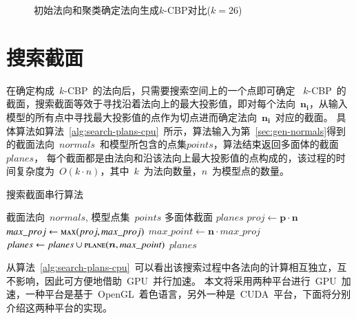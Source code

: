 \begin{figure}[htbp]
\setcounter{subfigure}{0}
  \centering
  \hspace{3em}%
  \hspace{3em}%
  \caption{初始法向和聚类确定法向生成$k$-CBP对比($k=26$)}
  \label{lbl:kemans-fixed-kcbp}
\end{figure}

\section{搜索截面}
\label{sec:search:planes}

在确定构成~$k$-CBP~的法向后，只需要搜索空间上的一个点即可确定
~$k$-CBP~的截面，搜索截面等效于寻找沿着法向上的最大投影值，即对每个法向~$\bm{n_i}$，从输入模型的所有点中寻找最大投影值的点作为切点进而确定法向~$\bm{n_i}$~对应的截面。
具体算法如算法~\ref{alg:search-plans-cpu}~所示，算法输入为第~\ref{sec:gen-normals}得到的截面法向~$normals$~和模型所包含的点集$points$，算法结束返回多面体的截面~$planes$，
每个截面都是由法向和沿该法向上最大投影值的点构成的，该过程的时间复杂度为~$O(k\cdot n)$，其中~$k$~为法向数量，$n$~为模型点的数量。

\begin{algorithm}[htbp]
\small
\caption{搜索截面串行算法}
\label{alg:search-plans-cpu}
\begin{algorithmic}[1]
\Require
截面法向~$normals$, 模型点集~$points$
\Ensure
多面体截面 $planes$
          \State $proj \gets  \bm{p} \cdot \bm{n}$ 
          \State $max\_proj \gets \Call{max}{proj, max\_proj}$ 
      \EndFor
  \EndFor
      \State $max\_point \gets \bm{n} \cdot max\_proj$ 
      \State $planes\gets planes \cup \Call{plane}{\bm{n}, max\_point}$ 
  \EndFor
  \State \Return $planes$
\EndFunction
\end{algorithmic}
\end{algorithm}

从算法~\ref{alg:search-plans-cpu}~可以看出该搜索过程中各法向的计算相互独立，互不影响，因此可方便地借助~GPU~并行加速。
本文将采用两种平台进行~GPU~加速，一种平台是基于~OpenGL~着色语言，另外一种是~CUDA~平台，下面将分别介绍这两种平台的实现。

